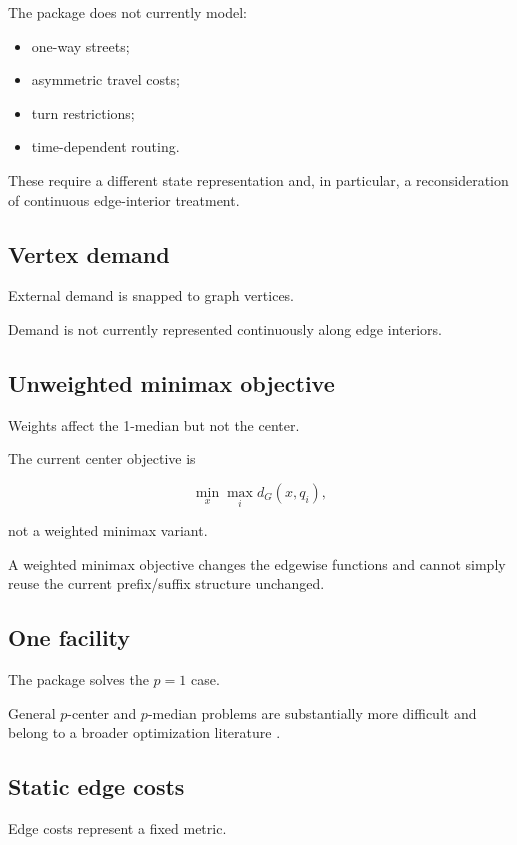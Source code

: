 \documentclass[11pt]{article}
\begin{document}
The package does not currently model:

\begin{itemize}[leftmargin=1.5em]
\item one-way streets;
\item asymmetric travel costs;
\item turn restrictions;
\item time-dependent routing.
\end{itemize}

These require a different state representation and, in particular, a
reconsideration of continuous edge-interior treatment.

\subsection{Vertex demand}

External demand is snapped to graph vertices.

Demand is not currently represented continuously along edge interiors.

\subsection{Unweighted minimax objective}

Weights affect the 1-median but not the center.

The current center objective is

\[
\min_x\max_i d_G(x,q_i),
\]

not a weighted minimax variant.

A weighted minimax objective changes the edgewise functions and cannot simply
reuse the current prefix/suffix structure unchanged.

\subsection{One facility}

The package solves the \(p=1\) case.

General \(p\)-center and \(p\)-median problems are substantially more difficult
and belong to a broader optimization literature
\cite{KarivHakimi1979a,KarivHakimi1979b}.

\subsection{Static edge costs}

Edge costs represent a fixed metric.
\end{document}
